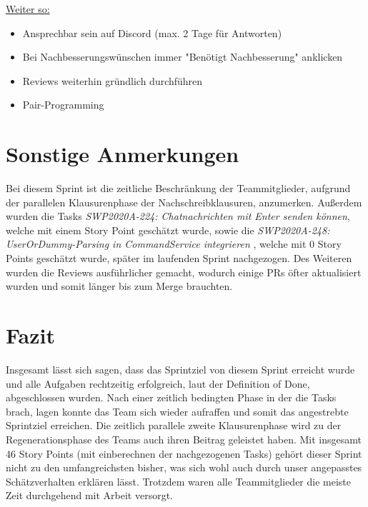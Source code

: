 \documentclass[12pt,a4paper, oneside]{article}
\begin{document}
    \underline{Weiter so:}
    \begin{itemize}
        \item Ansprechbar sein auf Discord (max. 2 Tage für Antworten)
        \item Bei Nachbesserungswünschen immer "Benötigt Nachbesserung" anklicken
        \item Reviews weiterhin gründlich durchführen
        \item Pair-Programming
    \end{itemize}

    \newpage


    \section{Sonstige Anmerkungen}

    Bei diesem Sprint ist die zeitliche Beschränkung der Teammitglieder, aufgrund der parallelen Klausurenphase der Nachschreibklausuren, anzumerken.
    Außerdem wurden die Tasks \textit{SWP2020A-224: Chatnachrichten mit Enter senden können}, welche mit einem Story Point geschätzt wurde, sowie die \textit{SWP2020A-248: UserOrDummy-Parsing in CommandService integrieren} , welche mit 0 Story Points geschätzt wurde, später im laufenden Sprint nachgezogen.
    Des Weiteren wurden die Reviews ausführlicher gemacht, wodurch einige PRs öfter aktualisiert wurden und somit länger
    bis zum Merge brauchten.


    \section{Fazit}
    Insgesamt lässt sich sagen, dass das Sprintziel von diesem Sprint erreicht wurde und alle Aufgaben rechtzeitig erfolgreich, laut der Definition of Done, abgeschlossen wurden.
    Nach einer zeitlich bedingten Phase in der die Tasks brach, lagen konnte das Team sich wieder aufraffen und somit das angestrebte Sprintziel erreichen.
    Die zeitlich parallele zweite Klausurenphase wird zu der Regenerationsphase des Teams auch ihren Beitrag geleistet haben.
    Mit insgesamt 46 Story Points (mit einberechnen der nachgezogenen Tasks) gehört dieser Sprint nicht zu den umfangreichsten bisher, was sich wohl auch durch unser angepasstes Schätzverhalten erklären lässt.
    Trotzdem waren alle Teammitglieder die meiste Zeit durchgehend mit Arbeit versorgt.
\end{document}
